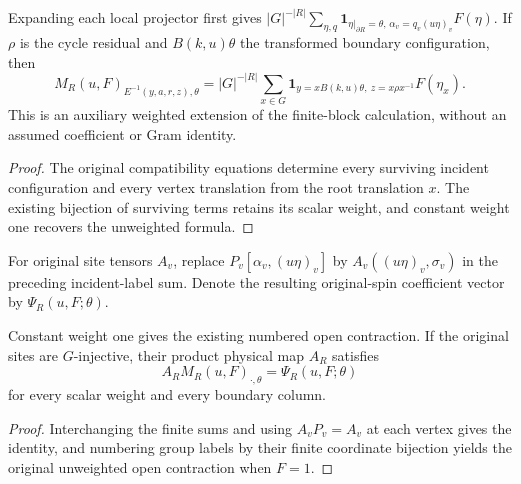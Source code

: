 \begin{lemma}
    \label{thm:peps_regular_weighted_projector_coordinates}
    \leanok
    Expanding each local projector first gives
    $|G|^{-|R|}\sum_{\eta,q}\mathbf1_{\eta|_{\partial R}=\theta,\,
            \alpha_v=q_v(u\eta)_v}F(\eta)$.
    If $\rho$ is the cycle residual and $B(k,u)\theta$ the transformed
    boundary configuration, then
    \[
        M_R(u,F)_{E^{-1}(y,a,r,z),\theta}
        =|G|^{-|R|}\sum_{x\in G}
        \mathbf1_{y=xB(k,u)\theta,\ z=x\rho x^{-1}}F(\eta_x).
    \]
    This is an auxiliary weighted extension of the finite-block
    calculation, without an assumed coefficient or Gram identity.
\end{lemma}
\begin{proof}\leanok
    The original compatibility equations determine every surviving incident
    configuration and every vertex translation from the root translation $x$.
    The existing bijection of surviving terms retains its scalar weight, and
    constant weight one recovers the unweighted formula.
\end{proof}

\begin{definition}
    \label{def:peps_regular_weighted_open_contraction}
    \leanok
    For original site tensors $A_v$, replace $P_v[\alpha_v,(u\eta)_v]$ by
    $A_v((u\eta)_v,\sigma_v)$ in the preceding incident-label sum.
    Denote the resulting original-spin coefficient vector by
    $\Psi_R(u,F;\theta)$.
\end{definition}

\begin{lemma}
    \label{thm:peps_regular_weighted_open_recovery}
    \leanok
    Constant weight one gives the existing numbered open contraction.
    If the original sites are $G$-injective, their product physical map $A_R$
    satisfies
    \[
        A_R M_R(u,F)_{\cdot,\theta}=\Psi_R(u,F;\theta)
    \]
    for every scalar weight and every boundary column.
\end{lemma}
\begin{proof}\leanok
    Interchanging the finite sums and using $A_vP_v=A_v$ at each vertex gives the identity,
    and numbering group labels by their finite coordinate bijection yields the
    original unweighted open contraction when $F=1$.
\end{proof}

